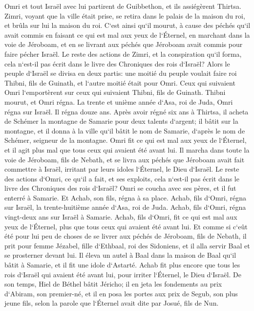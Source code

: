 \verse Omri et tout Israël avec lui partirent de Guibbethon, et ils assiégèrent Thirtsa. 
\verse Zimri, voyant que la ville était prise, se retira dans le palais de la maison du roi, et brûla sur lui la maison du roi. 
\verse C`est ainsi qu`il mourut, à cause des péchés qu`il avait commis en faisant ce qui est mal aux yeux de l`Éternel, en marchant dans la voie de Jéroboam, et en se livrant aux péchés que Jéroboam avait commis pour faire pécher Israël. 
\verse Le reste des actions de Zimri, et la conspiration qu`il forma, cela n`est-il pas écrit dans le livre des Chroniques des rois d`Israël? 
\verse Alors le peuple d`Israël se divisa en deux partis: une moitié du peuple voulait faire roi Thibni, fils de Guinath, et l`autre moitié était pour Omri. 
\verse Ceux qui suivaient Omri l`emportèrent sur ceux qui suivaient Thibni, fils de Guinath. Thibni mourut, et Omri régna. 
\verse La trente et unième année d`Asa, roi de Juda, Omri régna sur Israël. Il régna douze ans. Après avoir régné six ans à Thirtsa, 
\verse il acheta de Schémer la montagne de Samarie pour deux talents d`argent; il bâtit sur la montagne, et il donna à la ville qu`il bâtit le nom de Samarie, d`après le nom de Schémer, seigneur de la montagne. 
\verse Omri fit ce qui est mal aux yeux de l`Éternel, et il agit plus mal que tous ceux qui avaient été avant lui. 
\verse Il marcha dans toute la voie de Jéroboam, fils de Nebath, et se livra aux péchés que Jéroboam avait fait commettre à Israël, irritant par leurs idoles l`Éternel, le Dieu d`Israël. 
\verse Le reste des actions d`Omri, ce qu`il a fait, et ses exploits, cela n`est-il pas écrit dans le livre des Chroniques des rois d`Israël? 
\verse Omri se coucha avec ses pères, et il fut enterré à Samarie. Et Achab, son fils, régna à sa place. 
\verse Achab, fils d`Omri, régna sur Israël, la trente-huitième année d`Asa, roi de Juda. Achab, fils d`Omri, régna vingt-deux ans sur Israël à Samarie. 
\verse Achab, fils d`Omri, fit ce qui est mal aux yeux de l`Éternel, plus que tous ceux qui avaient été avant lui. 
\verse Et comme si c`eût été pour lui peu de choses de se livrer aux péchés de Jéroboam, fils de Nebath, il prit pour femme Jézabel, fille d`Ethbaal, roi des Sidoniens, et il alla servir Baal et se prosterner devant lui. 
\verse Il éleva un autel à Baal dans la maison de Baal qu`il bâtit à Samarie, 
\verse et il fit une idole d`Astarté. Achab fit plus encore que tous les rois d`Israël qui avaient été avant lui, pour irriter l`Éternel, le Dieu d`Israël. 
\verse De son temps, Hiel de Béthel bâtit Jéricho; il en jeta les fondements au prix d`Abiram, son premier-né, et il en posa les portes aux prix de Segub, son plus jeune fils, selon la parole que l`Éternel avait dite par Josué, fils de Nun. 

